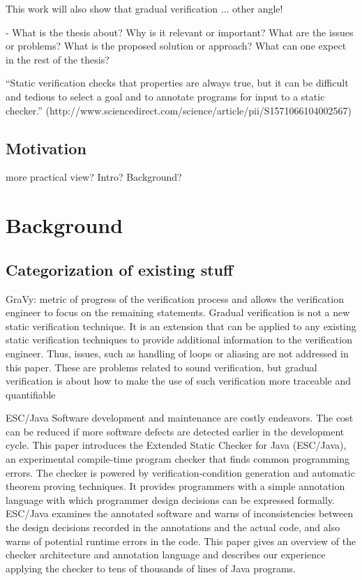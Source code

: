 This work will also show that gradual verification ... other angle!

- 
What is the thesis about?
Why is it relevant or important?
What are the issues or problems?
What is the proposed solution or approach?
What can one expect in the rest of the thesis?

“Static verification checks that properties are always true, but it can be difficult and tedious to select a goal and to annotate programs for input to a static checker.” (http://www.sciencedirect.com/science/article/pii/S1571066104002567)


\section{Motivation}
more practical view? Intro? Background?



\chapter{Background}

\section{Categorization of existing stuff}

\cite{arlt2014gradual}
GraVy:
metric of progress of the verification process
and allows the verification engineer to focus on the remaining statements.
Gradual verification is not a new static verification technique. It is an extension
that can be applied to any existing static verification techniques to provide
additional information to the verification engineer. Thus, issues, such as handling
of loops or aliasing are not addressed in this paper. These are problems
related to sound verification, but gradual verification is about how to make the
use of such verification more traceable and quantifiable

\cite{nelson2004extended} ESC/Java
Software development and maintenance are costly endeavors.
The cost can be reduced if more software defects are
detected earlier in the development cycle. This paper introduces
the Extended Static Checker for Java (ESC/Java),
an experimental compile-time program checker that finds
common programming errors. The checker is powered by
verification-condition generation and automatic theorem proving
techniques. It provides programmers with a simple
annotation language with which programmer design decisions
can be expressed formally. ESC/Java examines the
annotated software and warns of inconsistencies between the
design decisions recorded in the annotations and the actual
code, and also warns of potential runtime errors in the code.
This paper gives an overview of the checker architecture and
annotation language and describes our experience applying
the checker to tens of thousands of lines of Java programs.

